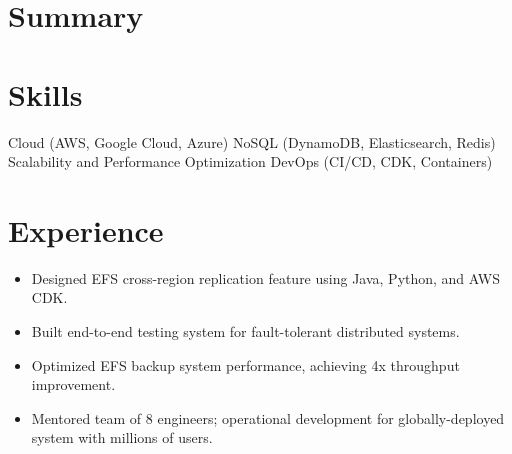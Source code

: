 \documentclass[11pt,a4paper,sans]{moderncv}
\begin{document}
\maketitle

\section{\textbf{Summary}}



\section{\textbf{Skills}}


                       {Cloud (AWS, Google Cloud, Azure)}
                       {NoSQL (DynamoDB, Elasticsearch, Redis)}
                       {Scalability and Performance Optimization}
                       { DevOps (CI/CD, CDK, Containers) }





\section{\textbf{Experience}}

{ \begin{itemize} \itemsep -2pt
  \item Designed EFS cross-region replication feature using Java, Python, and AWS CDK.
  \item Built end-to-end testing system for fault-tolerant distributed systems.
  \item Optimized EFS backup system performance, achieving 4x throughput improvement.
  \item Mentored team of 8 engineers; operational development for globally-deployed system with millions of users.
 \end{itemize} }
\end{document}
